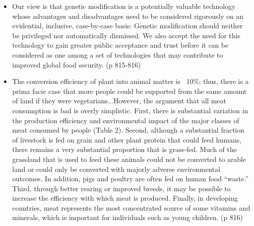 \documentclass[twoside]{article}	%
\begin{document}
\begin{itemize}
  \item Our view is that genetic modification is a potentially valuable technology whose advantages and disadvantages need to be considered rigorously on an evidential, inclusive, case-by-case basis: Genetic modification should neither be privileged nor automatically dismissed. We also accept the need for this technology to gain greater public acceptance and trust before it can be considered as one among a set of technologies that may contribute to improved global food security. (p 815-816)
  \item The conversion efficiency of plant into animal matter is ~10\%; thus, there is a prima facie case that more people could be supported from the same amount of land if they were vegetarians...However, the argument that all meat consumption is bad is overly simplistic. First, there is substantial variation in the production efficiency and environmental impact of the major classes of meat consumed by people (Table 2). Second, although a substantial fraction of livestock is fed on grain and other plant protein that could feed humans, there remains a very substantial proportion that is grass-fed. Much of the grassland that is used to feed these animals could not be converted to arable land or could only be converted with majorly adverse environmental outcomes. In addition, pigs and poultry are often fed on human food “waste.” Third, through better rearing or improved breeds, it may be possible to increase the efficiency with which meat is produced. Finally, in developing countries, meat represents the most concentrated source of some vitamins and minerals, which is important for individuals such as young children. (p 816)
\end{itemize}
\end{document}
